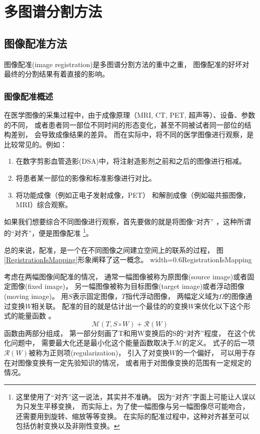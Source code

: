 
\chapter{多图谱分割方法}


\section{图像配准方法}
图像配准(image registration)是多图谱分割方法的重中之重，
图像配准的好坏对最终的分割结果有着直接的影响。

\subsection{图像配准概述}
在医学图像的采集过程中，由于成像原理（MRI, CT, PET, 超声等）、设备、参数的不同，
或者患者同一部位不同时间的形态变化，甚至不同被试者同一部位的结构差别，
会导致成像结果的差异。
而在实际中，将不同的医学图像进行观察，是比较常见的。例如：
\begin{enumerate}
  \item 在数字剪影血管造影(DSA)中，将注射造影剂之前和之后的图像进行相减。
  \item 将患者某一部位的影像和标准影像进行对比。
  \item 将功能成像（例如正电子发射成像，PET）%
    和解剖成像（例如磁共振图像，MRI）综合观察。
\end{enumerate}
如果我们想要综合不同图像进行观察，首先要做的就是将图像``对齐''
，这种所谓的``对齐''，便是图像配准
\footnote{这里使用了``对齐''这一说法，其实并不准确。
因为``对齐''字面上可能让人误以为只发生平移变换，
而实际上，为了使一幅图像与另一幅图像尽可能吻合，
还需要用到旋转、缩放等等变换。
在实际的配准过程中，这种对齐甚至可以包括仿射变换以及非刚性变换。}。

总的来说，配准，是一个在不同图像之间建立空间上的联系的过程，
图\ref{RegistrationIsMapping}形象阐释了这一概念。
%
{width=0.6\textwidth}{RegistrationIsMapping}

考虑在两幅图像间配准的情况，
通常一幅图像被称为原图像(source image)或者固定图像(fixed image)，
另一幅图像被称为目标图像(target image)或者浮动图像(moving image)。
用$S$表示固定图像，$T$指代浮动图像，
两幅定义域为$\Omega$的图像通过变换$W$相关联。
配准的目的就是估计出一个最佳的的变换$W$来优化以下这个形式的能量函数
。
\begin{equation}\label{LossFunction}
\mathcal{M}(T,S\circ W)+\mathcal{R}(W)
\end{equation}
函数由两部分组成，
第一部分刻画了T和用W变换后的S的``对齐''程度，
在这个优化问题中，
需要最大化还是最小化这个能量函数取决于$\mathcal{M}$的定义。
式子的后一项$\mathcal{R}(W)$被称为正则项(regularization)，
引入了对变换$W$的一个偏好，
可以用于存在对图像变换有一定先验知识的情况，
或者用于对图像变换的范围有一定规定的情况。

